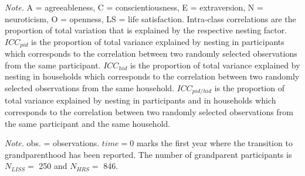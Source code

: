 \documentclass[
  english,
  man, noextraspace]{apa7}
\newenvironment{lltable}{\begin{landscape}\begin{center}\begin{ThreePartTable}}{\end{ThreePartTable}\end{center}\end{landscape}}
\begin{document}
\begin{appendix}
\begin{table}[h]
\begin{center}
\begin{threeparttable}
\begin{tablenotes}[para]
\normalsize{\textit{Note.} A = agreeableness, C = conscientiousness, E = extraversion, N = neuroticism, O = openness, LS = life satisfaction. Intra-class correlations are the proportion of total variation that is explained by the respective nesting factor. $ICC_{pid}$ is the proportion of total variance explained by nesting in participants which corresponds to the correlation between two randomly selected observations from the same participant. $ICC_{hid}$ is the proportion of total variance explained by nesting in households which corresponds to the correlation between two randomly selected observations from the same household. $ICC_{pid/hid}$ is the proportion of total variance explained by nesting in participants and in households which corresponds to the correlation between two randomly selected observations from the same participant and the same household.}
\end{tablenotes}

\end{threeparttable}
\end{center}

\end{table}










\begin{lltable}

\begin{TableNotes}[para]
\normalsize{\textit{Note.} obs. = observations. \(time=0\) marks
the first year where the transition to grandparenthood has been
reported. The number of grandparent participants is \(N_{LISS}=\) 250
and \(N_{HRS}=\) 846.}
\end{TableNotes}

\small{

}
\end{lltable}
\end{appendix}
\end{document}
